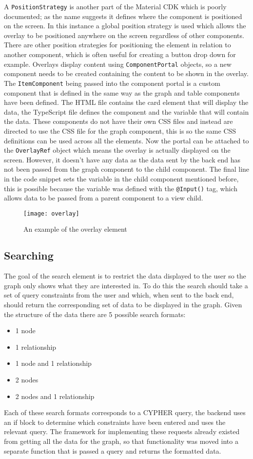 A \verb|PositionStrategy| is another part of the Material CDK which is poorly documented; as the name suggests it defines where the component is positioned on the screen.
In this instance a global position strategy is used which allows the overlay to be positioned anywhere on the screen regardless of other components. There are 
other position strategies for positioning the element in relation to another component, which is often useful for creating a button drop down for example.
Overlays display content using \verb|ComponentPortal| objects, so a new component needs to be created containing the content to be shown in the overlay. 
The \verb|ItemComponent| being passed into the component portal is a custom component that is defined in the same way as the graph and table components have been defined.
The HTML file contains the card element that will display the data, the TypeScript file defines the component and the variable that will contain the data. These components do not 
have their own CSS files and instead are directed to use the CSS file for the graph component, this is so the same CSS definitions can be used across all the elements.
Now the portal can be attached to the \verb|OverlayRef| object which means the overlay is actually displayed on the screen. However, it doesn't have any data as the data sent by the 
back end has not been passed from the graph component to the child component. The final line in the code snippet sets the variable in the child component mentioned before, this is possible because 
the variable was defined with the \verb|@Input()| tag, which allows data to be passed from a parent component to a view child.
\begin{figure}[H]
    \centering
    \texttt{[image: overlay]}
    \caption{An example of the overlay element}
\end{figure}
\subsection{Searching}
The goal of the search element is to restrict the data displayed to the user so the graph only shows what they are interested in.
To do this the search should take a set of query constraints from the user and which, when sent to the back end, should return the 
corresponding set of data to be displayed in the graph. Given the structure of the data there are 5 possible search formats:
\begin{itemize}
    \item 1 node
    \item 1 relationship
    \item 1 node and 1 relationship
    \item 2 nodes
    \item 2 nodes and 1 relationship
\end{itemize}
Each of these search formats corresponds to a CYPHER query, the backend uses an if block to determine which constraints have been 
entered and uses the relevant query. The framework for implementing these requests already existed from getting all the data for the graph, so that 
functionality was moved into a separate function that is passed a query and returns the formatted data. 

